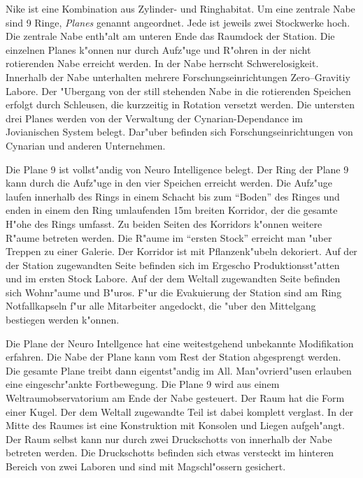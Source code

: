 
Nike ist eine Kombination aus Zylinder- und Ringhabitat. Um eine zentrale Nabe sind 9 Ringe, \emph{Planes} genannt angeordnet. Jede ist jeweils zwei Stockwerke hoch. Die zentrale Nabe enth"alt am unteren Ende das Raumdock der Station.  Die einzelnen Planes k"onnen nur durch Aufz"uge und R"ohren in der nicht rotierenden Nabe erreicht werden. In der Nabe herrscht Schwerelosigkeit. Innerhalb der Nabe unterhalten mehrere Forschungseinrichtungen Zero--Gravitiy Labore. Der "Ubergang von der still stehenden Nabe in die rotierenden Speichen erfolgt durch Schleusen, die kurzzeitig in Rotation versetzt werden. Die untersten drei Planes werden von der Verwaltung der Cynarian-Dependance im Jovianischen System belegt. Dar"uber befinden sich Forschungseinrichtungen von Cynarian und anderen Unternehmen.

Die Plane 9 ist vollst"andig von Neuro Intelligence belegt. Der Ring der Plane 9 kann durch die Aufz"uge in den vier Speichen erreicht werden. Die Aufz"uge laufen innerhalb des Rings in einem Schacht bis zum "`Boden"' des Ringes und enden in einem den Ring umlaufenden 15m breiten Korridor, der die gesamte H"ohe des Rings umfasst. Zu beiden Seiten des Korridors k"onnen weitere R"aume betreten werden. Die R"aume im "`ersten Stock"' erreicht man "uber Treppen zu einer Galerie. Der Korridor ist mit Pflanzenk"ubeln dekoriert. Auf der der Station zugewandten Seite befinden sich im Ergescho\3 Produktionsst"atten und im ersten Stock Labore. Auf der dem Weltall zugewandten Seite befinden sich Wohnr"aume und B"uros. F"ur die Evakuierung der Station sind am Ring Notfallkapseln f"ur alle Mitarbeiter angedockt, die "uber den Mittelgang bestiegen werden k"onnen.

Die Plane der Neuro Intellgence hat eine weitestgehend unbekannte Modifikation erfahren. Die Nabe der Plane kann vom Rest der Station abgesprengt werden. Die gesamte Plane treibt dann eigentst"andig im All. Man"ovrierd"usen erlauben eine eingeschr"ankte Fortbewegung. Die Plane 9 wird aus einem Weltraumobservatorium am Ende der Nabe gesteuert. Der Raum hat die Form einer Kugel. Der dem Weltall zugewandte Teil ist dabei komplett verglast. In der Mitte des Raumes ist eine Konstruktion mit Konsolen und Liegen aufgeh"angt. Der Raum selbst kann nur durch zwei Druckschotts von innerhalb der Nabe betreten werden. Die Druckschotts befinden sich etwas versteckt im hinteren Bereich von zwei Laboren und sind mit Magschl"ossern gesichert.


